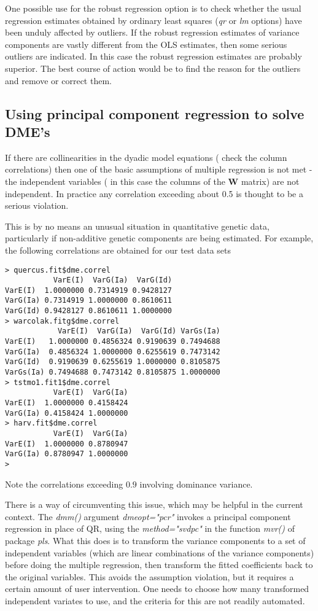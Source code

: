 \documentclass[titlepage]{article}  %
\begin{document}
One possible use for the robust regression option is to check whether the usual regression estimates obtained by ordinary least squares ({\em qr} or {\em lm} options) have been unduly affected by outliers. If the robust regression estimates of variance components are vastly different from the OLS estimates, then some serious outliers are indicated. In this case the robust regression estimates are probably superior. The best course of action would be to find the reason for the outliers and remove or correct them.

\subsection{Using principal component regression to solve DME's}
\label{pcreg}

If there are collinearities in the dyadic model equations ( check the column correlations) then one of the basic assumptions of multiple regression is not met - the independent variables ( in this case the columns of the $\bm{W}$ matrix) are not independent. In practice any correlation exceeding about 0.5 is thought to be a serious violation.

This is by no means an unusual situation in quantitative genetic data, particularly if non-additive genetic components are being estimated. For example, the following correlations are obtained for our test data sets

\begin{verbatim}
> quercus.fit$dme.correl
           VarE(I)  VarG(Ia)  VarG(Id)
VarE(I)  1.0000000 0.7314919 0.9428127
VarG(Ia) 0.7314919 1.0000000 0.8610611
VarG(Id) 0.9428127 0.8610611 1.0000000
> warcolak.fitg$dme.correl
            VarE(I)  VarG(Ia)  VarG(Id) VarGs(Ia)
VarE(I)   1.0000000 0.4856324 0.9190639 0.7494688
VarG(Ia)  0.4856324 1.0000000 0.6255619 0.7473142
VarG(Id)  0.9190639 0.6255619 1.0000000 0.8105875
VarGs(Ia) 0.7494688 0.7473142 0.8105875 1.0000000
> tstmo1.fit1$dme.correl
           VarE(I)  VarG(Ia)
VarE(I)  1.0000000 0.4158424
VarG(Ia) 0.4158424 1.0000000
> harv.fit$dme.correl
           VarE(I)  VarG(Ia)
VarE(I)  1.0000000 0.8780947
VarG(Ia) 0.8780947 1.0000000
> 
\end{verbatim}

Note the correlations exceeding $0.9$ involving dominance variance.

There is a way of circumventing this issue, which may be helpful in the current context. The {\em dmm()} argument {\em dmeopt="pcr"} invokes a principal component regression in place of QR, using the {\em method="svdpc"} in the function {\em mvr()} of package {\em pls}.
What this does is to transform the variance components to a set of independent variables (which are linear combinations of the variance components) before doing the multiple regression, then transform the fitted coefficients back to the original variables. This avoids the assumption violation, but it requires a certain amount of user intervention. One needs to choose how many transformed independent variates to use, and the criteria for this are not readily automated.
\end{document}
